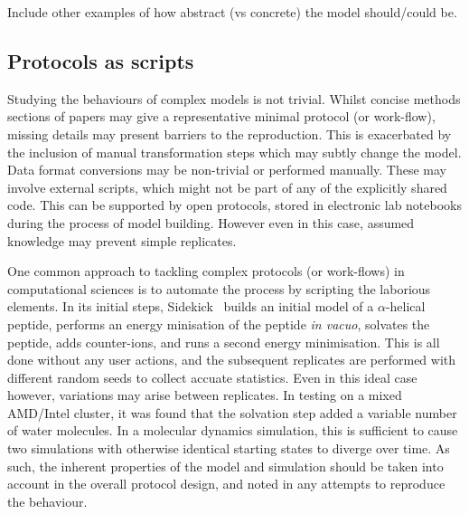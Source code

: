 \documentclass[conference]{IEEEtran}
\begin{document}
Include other examples of how abstract (vs concrete) the model should/could be. 




\subsection{Protocols as scripts}



Studying the behaviours of complex models is not trivial. Whilst 
concise methods sections of papers may give a representative minimal
protocol (or work-flow), missing details may present barriers to 
the reproduction. This is exacerbated by the inclusion of manual 
transformation steps which may subtly change the model. Data format 
conversions may be non-trivial or performed manually. These may 
involve external scripts, which might not be part of any of the
explicitly shared code. This can be supported by open protocols, stored 
in electronic lab notebooks during the process of model building. However
even in this case, assumed knowledge may prevent simple replicates.

One common approach to tackling complex protocols (or work-flows) 
in computational sciences is to automate the process by scripting
the laborious elements. In its initial steps, Sidekick~\cite{Hall2014}
builds an initial model of a $\alpha$-helical peptide, performs an
energy minisation of the peptide \emph{in vacuo}, solvates the peptide,
adds counter-ions, and runs a second energy minimisation. This is all
done without any user actions, and the subsequent replicates are performed
with different random seeds to collect accuate statistics. Even in this 
ideal case however, variations may arise between replicates. In testing 
on a mixed AMD/Intel cluster, it was found that the solvation step added
a variable number of water molecules. In a molecular dynamics simulation, 
this is sufficient to cause two simulations with otherwise identical 
starting states to diverge over time. As such, the inherent properties
of the model and simulation should be taken into account in the overall
protocol design, and noted in any attempts to reproduce the behaviour.
\end{document}

